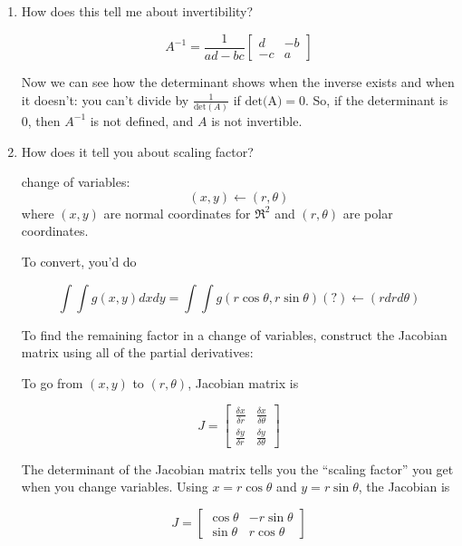 \documentclass[twocolumn,draft]{article}
\begin{document}
  \begin{enumerate}
  	\item 
	    How does this tell me about invertibility?
  
	    \begin{equation*}
	    	A^{-1} = \frac{1}{ad-bc}\begin{bmatrix}
	    								d & -b \\ -c & a
	    							\end{bmatrix}
	    \end{equation*}
  
	    Now we can see how the determinant shows when the inverse exists and when it doesn't:
	    you can't divide by $\frac{1}{\text{det}(A)}$ if $\text{det(A)}=0$. So, if the
	    determinant is $0$, then $A^{-1}$ is not defined, and $A$ is not invertible.
		
	\item   How does it tell you about scaling factor?
	
		change of variables:
		\begin{equation}
			(x,y) \leftarrow (r,\theta)
		\end{equation}
		where $(x,y)$ are normal coordinates for $\Re^{2}$ and $(r,\theta)$ are polar coordinates.
		
		To convert, you'd do
		
		\begin{equation*}
			\int\int g(x,y) dxdy = \int\int g(r\cos{\theta}, r\sin{\theta})(?) \leftarrow
				(rdrd\theta)
		\end{equation*}
		
		To find the remaining factor in a change of variables, construct the Jacobian matrix
		using all of the partial derivatives:
		
		To go from $(x,y)$ to $(r,\theta)$, Jacobian matrix is
		
		\begin{equation*}
			J = \begin{bmatrix}
					\frac{\delta x}{\delta r} & \frac{\delta x}{\delta \theta} \\
					\frac{\delta y}{\delta r} & \frac{\delta y}{\delta \theta}
				\end{bmatrix}
		\end{equation*}
		
		The determinant of the Jacobian matrix tells you the ``scaling factor'' you get when
		you change variables. Using $x=r\cos{\theta}$ and $y=r\sin{\theta}$, the Jacobian is
		
		\begin{equation*}
			J = \begin{bmatrix}
					\cos{\theta} & -r\sin{\theta} \\
					\sin{\theta} & r\cos{\theta}
				\end{bmatrix} 
		\end{equation*} 
		

\end{enumerate}
\end{document}
